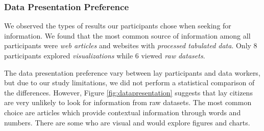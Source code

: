 \documentclass{sigchi}
\begin{document}

\subsubsection{Data Presentation Preference}
We observed the types of results our participants chose when seeking for information. We found that the most common source of information among all participants were \textit{web articles} and websites with \textit{processed tabulated data}. Only 8 participants explored \textit{visualizations} while 6 viewed \textit{raw datasets}.

The data presentation preference vary between lay participants and data workers, but due to our study limitations, we did not perform a statistical comparison of the differences. However, Figure \ref{fig:datapresentation} suggests that lay citizens are very unlikely to look for information from raw datasets. The most common choice are articles which provide contextual information through words and numbers. There are some who are visual and would explore figures and charts.

\end{document}

